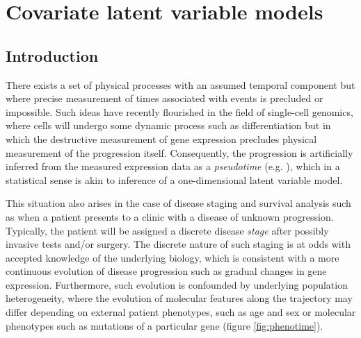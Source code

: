 \chapter{Covariate latent variable models}\label{ch:phenotimechap} %





\section{Introduction}

There exists a set of physical processes with an assumed temporal component but where precise measurement of times associated with events is precluded or impossible. %
Such ideas have recently flourished in the field of single-cell genomics, where cells will undergo some dynamic process such as differentiation but in which the destructive measurement of gene expression precludes physical measurement of the progression itself. Consequently, the progression is artificially inferred from the measured expression data as a \emph{pseudotime} (e.g. \cite{trapnell2014dynamics,delorean}), which in a statistical sense is akin to inference of a one-dimensional latent variable model.

This situation also arises in the case of disease staging and survival analysis such as when a patient presents to a clinic with a disease of unknown progression. Typically, the patient will be assigned a discrete disease \emph{stage} after possibly invasive tests and/or surgery. The discrete nature of such staging is at odds with accepted knowledge of the underlying biology, which is consistent with a more continuous evolution of disease progression such as gradual changes in gene expression. Furthermore, such evolution is confounded by underlying population heterogeneity, where the evolution of molecular features along the trajectory may differ depending on external patient phenotypes, such as age and sex or molecular phenotypes such as mutations of a particular gene (figure \ref{fig:phenotime}).

